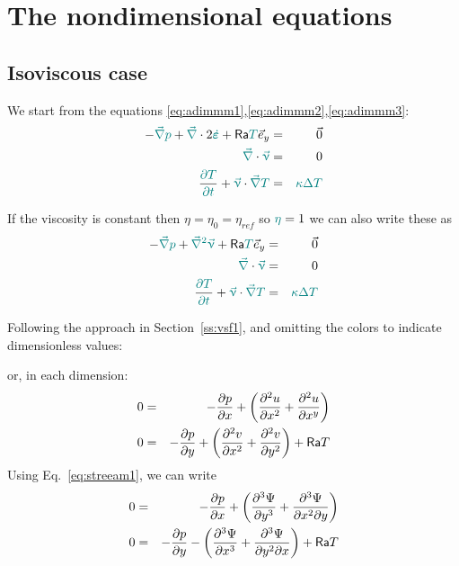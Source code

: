 \section{The nondimensional equations}

\subsection{Isoviscous case}

We start from the equations \eqref{eq:adimmm1},\eqref{eq:adimmm2},\eqref{eq:adimmm3}:
\begin{eqnarray}
-{\color{teal} \vec\nabla} {\color{teal}p} + {\color{teal} \vec\nabla} \cdot 2  {\color{teal} \dot{\bm\varepsilon}}
+ {\mathsf{Ra}}  {\color{teal} T} \vec{e}_y &=& \vec{0} \\
{\color{teal} \vec\nabla } \cdot  {\color{teal}\vec\upnu} &=& 0 \\
\frac{ {\color{teal} \partial T}}{ {\color{teal} \partial t}} 
+ {\color{teal} \vec\upnu} \cdot  {\color{teal}\vec\nabla} {\color{teal}T} 
&=&  {\color{teal} \kappa} {\color{teal}\Delta} {\color{teal}T}
\end{eqnarray}

If the viscosity is constant then $\eta=\eta_0=\eta_{ref}$ so ${\color{teal}\eta}=1$ we can also write these as
\begin{eqnarray}
-{\color{teal} \vec\nabla} {\color{teal}p} + {\color{teal} \vec\nabla^2 \vec\upnu} 
+ {\mathsf{Ra}}  {\color{teal} T} \vec{e}_y &=& \vec{0} \\
{\color{teal} \vec\nabla } \cdot  {\color{teal}\vec\upnu} &=& 0 \\
\frac{ {\color{teal} \partial T}}{ {\color{teal} \partial t}} 
+ {\color{teal} \vec\upnu} \cdot  {\color{teal}\vec\nabla} {\color{teal}T} 
&=&  {\color{teal} \kappa} {\color{teal}\Delta} {\color{teal}T}
\end{eqnarray}



Following the approach in Section~\ref{ss:vsf1}, and omitting the colors to indicate dimensionless values:


or, in each dimension:
\begin{eqnarray}
0&=&-\frac{\partial p}{\partial x} 
+ \left( \frac{\partial^2 u}{\partial x^2} + \frac{\partial^2 u}{\partial x^y} \right)  \\
0&=&-\frac{\partial p}{\partial y} 
+ \left(\frac{\partial^2 v}{\partial x^2} + \frac{\partial^2 v}{\partial y^2} \right) + {\mathsf{Ra}} T  
\end{eqnarray}
Using Eq.~\eqref{eq:streeam1}, we can write 
\begin{eqnarray}
0 &=& -\frac{\partial p}{\partial x} +  \left(
\frac{\partial^3 \Psi}{\partial y^3}  + \frac{\partial^3 \Psi}{\partial x^2 \partial y}
\right)  \nonumber\\
0 &=& -\frac{\partial p}{\partial y} -  \left(
\frac{\partial^3 \Psi}{\partial x^3}  + \frac{\partial^3 \Psi}{\partial y^2 \partial x}
\right) + {\mathsf{Ra}} T 
\end{eqnarray}


